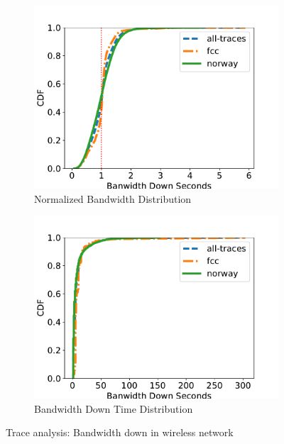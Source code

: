 \begin{figure}[htb]
\centering
\begin{subfigure}[b]{.45\columnwidth}
\centering
\includegraphics[width=\textwidth]{fig/trace.pdf}
\caption{Normalized Bandwidth Distribution}
\label{fig:trace}
\end{subfigure}
\begin{subfigure}[b]{.45\columnwidth}
\centering
\includegraphics[width=\textwidth]{fig/trace-down.pdf}
\caption{Bandwidth Down Time Distribution}
\label{fig:trace-down}
\end{subfigure}
\caption{Trace analysis: Bandwidth down in wireless network}
\label{fig:trace-all}
\end{figure}

